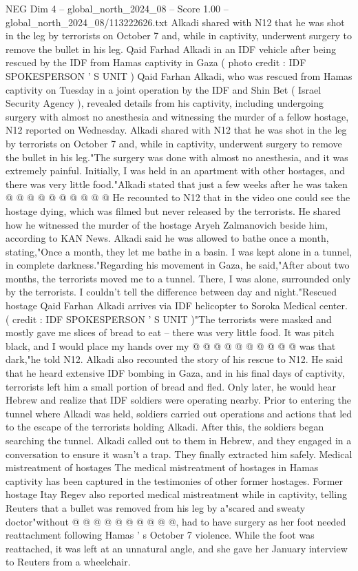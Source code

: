 \begin{textsample}{NEG Dim 4 – global\_north\_2024\_08 – Score 1.00 – global\_north\_2024\_08/113222626.txt}  \label{ex:f4_neg_294}
Alkadi shared with N12 that he was shot in the leg by terrorists on October 7 and, while in captivity, underwent surgery to remove the bullet in his leg.
Qaid Farhad Alkadi in an IDF vehicle after being rescued by the IDF from Hamas captivity in Gaza ( photo credit : IDF SPOKESPERSON ' S UNIT ) Qaid Farhan Alkadi, who was rescued from Hamas captivity on Tuesday in a joint operation by the IDF and Shin Bet ( Israel Security Agency ), revealed details from his captivity, including undergoing surgery with almost no anesthesia and witnessing the murder of a fellow hostage, N12 reported on Wednesday.
Alkadi shared with N12 that he was shot in the leg by terrorists on October 7 and, while in captivity, underwent surgery to remove the bullet in his leg."The surgery was done with almost no anesthesia, and it was extremely painful.
Initially, I was held in an apartment with other hostages, and there was very little food."Alkadi stated that just a few weeks after he was taken @ @ @ @ @ @ @ @ @ @ He recounted to N12 that in the video one could see the hostage dying, which was filmed but never released by the terrorists.
He shared how he witnessed the murder of the hostage Aryeh Zalmanovich beside him, according to KAN News.
Alkadi said he was allowed to bathe once a month, stating,"Once a month, they let me bathe in a basin.
I was kept alone in a tunnel, in complete darkness."Regarding his movement in Gaza, he said,"After about two months, the terrorists moved me to a tunnel.
There, I was alone, surrounded only by the terrorists.
I couldn't tell the difference between day and night."Rescued hostage Qaid Farhan Alkadi arrives via IDF helicopter to Soroka Medical center. ( credit : IDF SPOKESPERSON ' S UNIT )"The terrorists were masked and mostly gave me slices of bread to eat -- there was very little food.
It was pitch black, and I would place my hands over my @ @ @ @ @ @ @ @ @ @ was that dark,"he told N12.
Alkadi also recounted the story of his rescue to N12.
He said that he heard extensive IDF bombing in Gaza, and in his final days of captivity, terrorists left him a small portion of bread and fled.
Only later, he would hear Hebrew and realize that IDF soldiers were operating nearby.
Prior to entering the tunnel where Alkadi was held, soldiers carried out operations and actions that led to the escape of the terrorists holding Alkadi.
After this, the soldiers began searching the tunnel.
Alkadi called out to them in Hebrew, and they engaged in a conversation to ensure it wasn't a trap.
They finally extracted him safely.
Medical mistreatment of hostages The medical mistreatment of hostages in Hamas captivity has been captured in the testimonies of other former hostages.
Former hostage Itay Regev also reported medical mistreatment while in captivity, telling Reuters that a bullet was removed from his leg by a"scared and sweaty doctor"without @ @ @ @ @ @ @ @ @ @, had to have surgery as her foot needed reattachment following Hamas ' s October 7 violence.
While the foot was reattached, it was left at an unnatural angle, and she gave her January interview to Reuters from a wheelchair.

\end{textsample}
